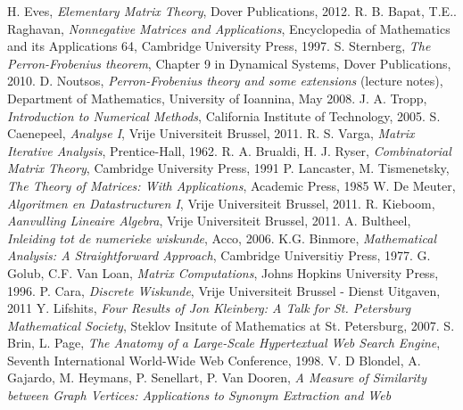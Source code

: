 \documentclass[a4paper,11pt]{report}
\begin{document}
   \newpage
\begin{thebibliography}{99}
 H. Eves, \emph{Elementary Matrix Theory}, Dover Publications, 
2012.
\bibitem[BAPAT] R. B. Bapat, T.E.. Raghavan, \emph{Nonnegative Matrices and 
Applications}, Encyclopedia of Mathematics and its Applications 64, Cambridge University Press, 1997. 
 S. Sternberg, \emph{The Perron-Frobenius theorem}, Chapter 9 in Dynamical Systems, Dover Publications, 2010.
 D. Noutsos, \emph{Perron-Frobenius theory and some extensions} (lecture notes), Department of Mathematics, University of Ioannina, May 2008.
 J. A. Tropp, \emph{Introduction to Numerical Methods}, California Institute of 
Technology, 2005.
 S. Caenepeel, \emph{Analyse I}, Vrije Universiteit Brussel, 2011.
\bibitem[VARGA] R. S. Varga, \emph{Matrix Iterative Analysis}, Prentice-Hall, 1962. 
\bibitem[BRUALDI] R. A. Brualdi, H. J. Ryser, \emph{Combinatorial Matrix Theory}, Cambridge University 
Press, 1991
\bibitem[LANCASTER] P. Lancaster, M. Tismenetsky, \emph{The Theory of Matrices: With 
Applications}, Academic Press, 1985
 W. De Meuter, \emph{Algoritmen en Datastructuren I}, Vrije Universiteit Brussel, 2011.
 R. Kieboom, \emph{Aanvulling Lineaire Algebra}, Vrije Universiteit Brussel, 2011.
 A. Bultheel, \emph{Inleiding tot de numerieke wiskunde}, Acco, 
2006.
 K.G. Binmore, \emph{Mathematical Analysis: A Straightforward Approach}, Cambridge Universitiy Press, 1977.
 G. Golub, C.F. Van Loan, \emph{Matrix Computations}, 
Johns Hopkins University Press, 1996.
 P. Cara, \emph{Discrete Wiskunde}, Vrije Universiteit Brussel - Dienst 
Uitgaven, 2011
 Y. Lifshits, \emph{Four Results of Jon Kleinberg: A Talk for St. Petersburg Mathematical 
Society}, Steklov Insitute of Mathematics at St. Petersburg, 2007.
 S. Brin, L. Page, \emph{The Anatomy of a Large-Scale Hypertextual Web Search Engine}, Seventh International World-Wide Web Conference, 1998.
 V. D Blondel, A. Gajardo, M. Heymans, P. Senellart, P. Van Dooren, 
\emph{A Measure of Similarity between Graph Vertices: Applications to Synonym Extraction and Web 
}
\end{thebibliography}
\end{document}
